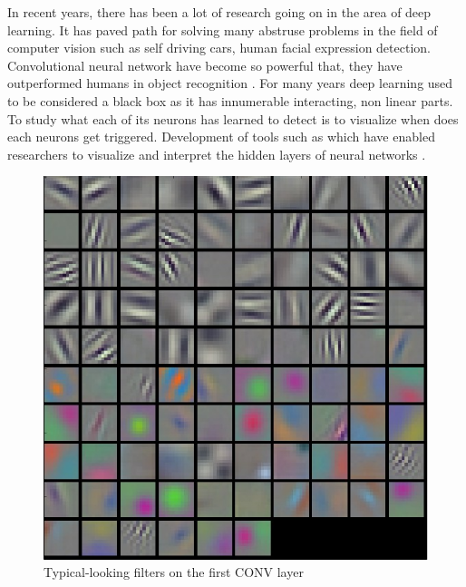 
\doublespacing
{}
   
In recent years, there has been a lot of research going on in the area of deep learning. It has paved path for solving many abstruse problems in the field of computer vision such as self driving cars, human facial expression detection\cite{1612.02903}. Convolutional neural network have become so powerful that, they have outperformed humans in  object recognition \cite{CNN-Better,krizhevsky2012imagenet,szegedy2015going,he2016deep,simonyan2014very}.  For many years deep learning used to be considered a black box as it has innumerable interacting, non linear parts. To study what each of its neurons has learned to detect is to visualize when does each neurons get triggered.
Development of tools such as \cite{tensorflow2015-whitepaper} which have enabled researchers to visualize and interpret the hidden layers of neural networks \cite{1506.06579}. 

\begin{figure}[H]
  \centering
    \includegraphics[scale=.3, angle=0]{Files/cnn_visaulize.jpeg}
    \caption[Typical-looking filters on the first CONV layer of a imagenet]{Typical-looking filters on the first CONV layer}
    \label{fig:visualize-cnn}
\end{figure}

